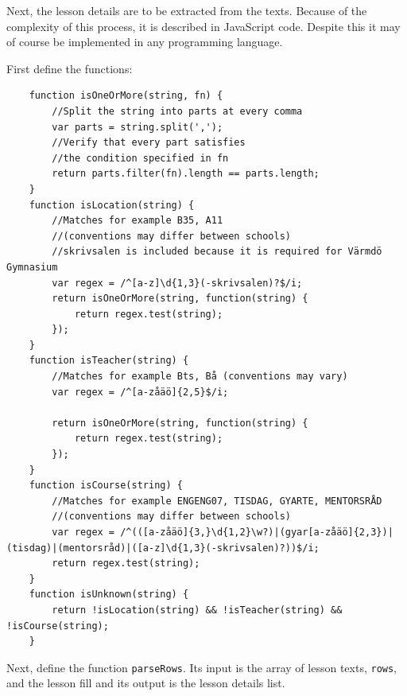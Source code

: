 \documentclass{article}
\begin{document}
	Next, the lesson details are to be extracted from the texts. Because of the complexity of this process, it is described in JavaScript code. Despite this it may of course be implemented in any programming language.
	
	First define the functions:
	
	\begin{lstlisting}
	function isOneOrMore(string, fn) {
		//Split the string into parts at every comma
		var parts = string.split(',');
		//Verify that every part satisfies
		//the condition specified in fn
		return parts.filter(fn).length == parts.length;
	}
	function isLocation(string) {
		//Matches for example B35, A11
		//(conventions may differ between schools)
		//skrivsalen is included because it is required for Värmdö Gymnasium
		var regex = /^[a-z]\d{1,3}(-skrivsalen)?$/i;
		return isOneOrMore(string, function(string) {
			return regex.test(string);
		});
	}
	function isTeacher(string) {
		//Matches for example Bts, Bå (conventions may vary)
		var regex = /^[a-zåäö]{2,5}$/i;
		
		return isOneOrMore(string, function(string) {
			return regex.test(string);
		});
	}
	function isCourse(string) {
		//Matches for example ENGENG07, TISDAG, GYARTE, MENTORSRÅD
		//(conventions may differ between schools)
		var regex = /^(([a-zåäö]{3,}\d{1,2}\w?)|(gyar[a-zåäö]{2,3})|(tisdag)|(mentorsråd)|([a-z]\d{1,3}(-skrivsalen)?))$/i;
		return regex.test(string);
	}
	function isUnknown(string) {
		return !isLocation(string) && !isTeacher(string) && !isCourse(string);
	}
	\end{lstlisting}
	Next, define the function \texttt{parseRows}. Its input is the array of lesson texts, \texttt{rows}, and the lesson fill and its output is the lesson details list.
	
\end{document}

